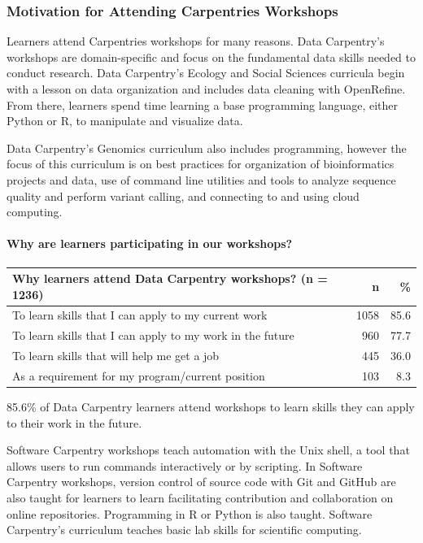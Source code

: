 \documentclass[]{article}
\let\oldparagraph\paragraph
\renewcommand{\paragraph}[1]{\oldparagraph{#1}\mbox{}}
\begin{document}
\subsubsection{Motivation for Attending Carpentries
Workshops}\label{motivation-for-attending-carpentries-workshops}

Learners attend Carpentries workshops for many reasons. Data Carpentry's
workshops are domain-specific and focus on the fundamental data skills
needed to conduct research. Data Carpentry's Ecology and Social Sciences
curricula begin with a lesson on data organization and includes data
cleaning with OpenRefine. From there, learners spend time learning a
base programming language, either Python or R, to manipulate and
visualize data.

Data Carpentry's Genomics curriculum also includes programming, however
the focus of this curriculum is on best practices for organization of
bioinformatics projects and data, use of command line utilities and
tools to analyze sequence quality and perform variant calling, and
connecting to and using cloud computing.

\paragraph{Why are learners participating in our
workshops?}\label{why-are-learners-participating-in-our-workshops}

\begin{longtable}[]{@{}lrr@{}}
\toprule
Why learners attend Data Carpentry workshops? (n = 1236) & n &
\%\tabularnewline
\midrule
\endhead
To learn skills that I can apply to my current work & 1058 &
85.6\tabularnewline
To learn skills that I can apply to my work in the future & 960 &
77.7\tabularnewline
To learn skills that will help me get a job & 445 & 36.0\tabularnewline
As a requirement for my program/current position & 103 &
8.3\tabularnewline
\bottomrule
\end{longtable}

85.6\% of Data Carpentry learners attend workshops to learn skills they
can apply to their work in the future.

Software Carpentry workshops teach automation with the Unix shell, a
tool that allows users to run commands interactively or by scripting. In
Software Carpentry workshops, version control of source code with Git
and GitHub are also taught for learners to learn facilitating
contribution and collaboration on online repositories. Programming in R
or Python is also taught. Software Carpentry's curriculum teaches basic
lab skills for scientific computing.
\end{document}
